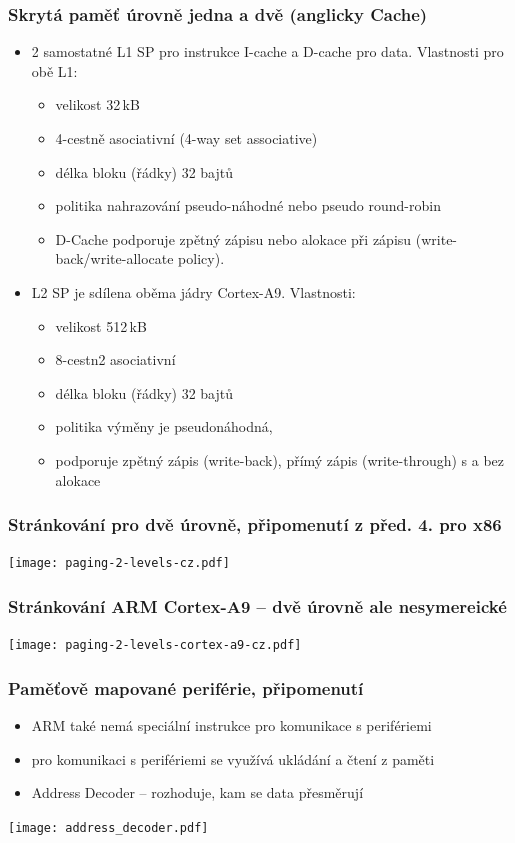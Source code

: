 \documentclass{beamer}
\begin{document}
\begin{frame}
\frametitle{Skrytá paměť úrovně jedna a dvě (anglicky Cache)}
\begin{itemize}
 \item 2 samostatné L1 SP pro instrukce I-cache a D-cache pro data. Vlastnosti pro obě L1:
 \begin{itemize}
  \item velikost 32\,kB
  \item 4-cestně asociativní (4-way set associative)
  \item délka bloku (řádky) 32 bajtů
  \item politika nahrazování pseudo-náhodné nebo pseudo round-robin
  \item D-Cache podporuje zpětný zápisu nebo alokace při zápisu (write-back/write-allocate policy).
 \end{itemize}
 \item L2 SP je sdílena oběma jádry Cortex-A9. Vlastnosti:
 \begin{itemize}
   \item velikost 512\,kB
   \item 8-cestn2 asociativní
   \item délka bloku (řádky) 32 bajtů
   \item politika výměny je pseudonáhodná,
   \item  podporuje zpětný zápis (write-back), přímý zápis (write-through) s a bez alokace
 \end{itemize}
\end{itemize}

\end{frame}

\begin{frame}
\frametitle{Stránkování pro dvě úrovně, připomenutí z před. 4. pro x86}

\texttt{[image: paging-2-levels-cz.pdf]}

\end{frame}

\begin{frame}
\frametitle{Stránkování ARM Cortex-A9 -- dvě úrovně ale nesymereické}

\texttt{[image: paging-2-levels-cortex-a9-cz.pdf]}

\end{frame}

\begin{frame}
\frametitle{Paměťově mapované periférie, připomenutí}

\begin{itemize}
\item ARM také nemá speciální instrukce pro komunikace s perifériemi
\item pro komunikaci s perifériemi se využívá ukládání a čtení z paměti
\item Address Decoder -- rozhoduje, kam se data přesměrují
\end{itemize}
\begin{center}
\texttt{[image: address\_decoder.pdf]}
\end{center}
\end{frame}
\end{document}
